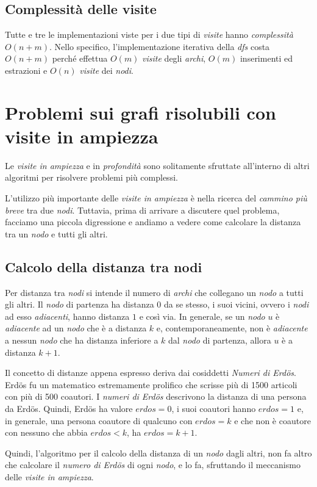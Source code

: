 \subsection{Complessità delle visite}
Tutte e tre le implementazioni viste per i due tipi di \emph{visite} hanno
\emph{complessità} $O(n+m)$. Nello specifico, l'implementazione iterativa della
\emph{dfs} costa $O(n+m)$ perché effettua $O(m)$ \emph{visite} degli \emph{archi},
$O(m)$ inserimenti ed estrazioni e $O(n)$ \emph{visite} dei \emph{nodi}.

\section{Problemi sui grafi risolubili con visite in ampiezza}
Le \emph{visite in ampiezza} e in \emph{profondità} sono solitamente
sfruttate all'interno di altri algoritmi per risolvere problemi più complessi.

L'utilizzo più importante delle \emph{visite in ampiezza} è nella ricerca del
\emph{cammino più breve} tra due \emph{nodi}. Tuttavia, prima di arrivare a
discutere quel problema, facciamo una piccola digressione e andiamo a vedere
come calcolare la distanza tra un \emph{nodo} e tutti gli altri.

\subsection{Calcolo della distanza tra nodi}
Per distanza tra \emph{nodi} si intende il numero di \emph{archi}
che collegano un \emph{nodo} a tutti gli altri. Il \emph{nodo} di partenza
ha distanza $0$ da se stesso, i suoi vicini, ovvero i \emph{nodi} ad esso
\emph{adiacenti}, hanno distanza $1$ e così via. In generale, se un \emph{nodo}
$u$ è \emph{adiacente} ad un \emph{nodo} che è a distanza $k$ e, contemporaneamente,
non è \emph{adiacente} a nessun \emph{nodo} che ha distanza inferiore a $k$ dal
\emph{nodo} di partenza, allora $u$ è a distanza $k+1$.

\begin{note}
    Il concetto di distanze appena espresso deriva dai cosiddetti \emph{Numeri di
    Erdös}. Erdös fu un matematico estremamente prolifico che scrisse più
    di 1500 articoli con più di 500 coautori. I \emph{numeri di Erdös} descrivono
    la distanza di una persona da Erdös. Quindi, Erdös ha valore $erdos=0$, i
    suoi coautori hanno $erdos=1$ e, in generale, una persona coautore di qualcuno
    con $erdos=k$ e che non è coautore con nessuno che abbia $erdos<k$, ha $erdos=k+1$.
\end{note}\noindent
Quindi, l'algoritmo per il calcolo della distanza di un \emph{nodo} dagli altri,
non fa altro che calcolare il \emph{numero di Erdös} di ogni \emph{nodo}, e lo fa,
sfruttando il meccanismo delle \emph{visite in ampiezza}.

